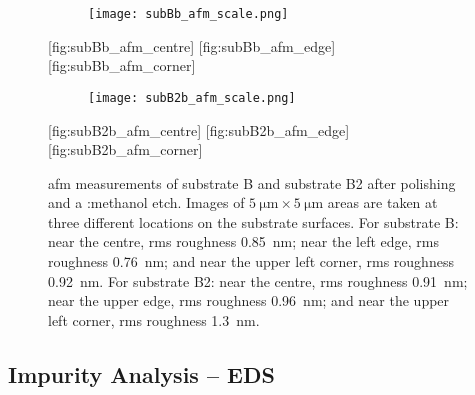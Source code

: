 \begin{figure}[htbp]
    \centering
    \begin{subfigure}[c]{0.032\linewidth}
        \label{fig:subBb_afm_scale}\captionsetup{list=no}
        \texttt{[image: subBb\_afm\_scale.png]}
    \end{subfigure}
    \hfill
    [fig:subBb_afm_centre]%
    \hfill
    [fig:subBb_afm_edge]%
    \hfill
    [fig:subBb_afm_corner] %
    \par\bigskip
    \begin{subfigure}[c]{0.032\linewidth}
        \label{fig:subB2b_afm_scale}\captionsetup{list=no}
        \texttt{[image: subB2b\_afm\_scale.png]}
    \end{subfigure}
    \hfill
    [fig:subB2b_afm_centre]
    \hfill
    [fig:subB2b_afm_edge]
    \hfill
    [fig:subB2b_afm_corner]
    \caption[\Ac{afm} of substrate B and substrate B2 after polishing and etching.]{\Ac{afm} measurements of substrate B and substrate B2 after polishing and a :methanol etch. Images of $\SI{5}{\micro\metre}\times\SI{5}{\micro\metre}$ areas are taken at three different locations on the substrate surfaces. For substrate B:  near the centre, \ac{rms} roughness \SI{0.85}{\nano\metre};  near the left edge, \ac{rms} roughness \SI{0.76}{\nano\metre}; and  near the upper left corner, \ac{rms} roughness \SI{0.92}{\nano\metre}. For substrate B2:  near the centre, \ac{rms} roughness \SI{0.91}{\nano\metre};  near the upper edge, \ac{rms} roughness \SI{0.96}{\nano\metre}; and  near the upper left corner, \ac{rms} roughness \SI{1.3}{\nano\metre}.}\label{fig:subBb_and_subB2_afm}
\end{figure} %


\subsection{Impurity Analysis -- EDS}

